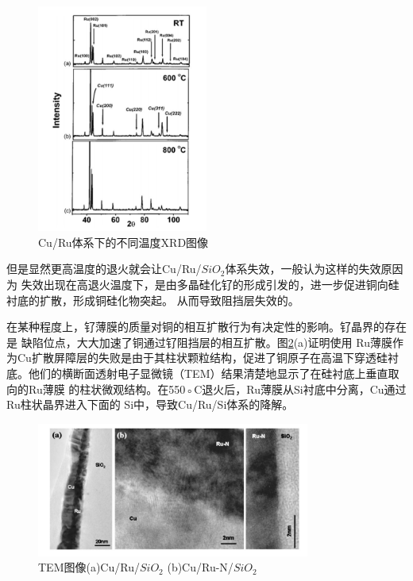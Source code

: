 \documentclass[UTF8,a4paper,12pt]{ctexart}%
\begin{document}
\begin{figure}[htb]
	\centering
	\includegraphics[width=0.5\textwidth]{3.jpg}
	\caption{Cu/Ru体系下的不同温度XRD图像}
	\label{Fig:3}
\end{figure}


但是显然更高温度的退火就会让Cu/Ru/$SiO_2$体系失效，一般认为这样的失效原因为
失效出现在高退火温度下，是由多晶硅化钌的形成引发的，进一步促进铜向硅衬底的扩散，形成铜硅化物突起。
从而导致阻挡层失效的。


在某种程度上，钌薄膜的质量对铜的相互扩散行为有决定性的影响。钌晶界的存在是
缺陷位点，大大加速了铜通过钌阻挡层的相互扩散。图\ref{Fig:4}(a)证明使用
Ru薄膜作为Cu扩散屏障层的失败是由于其柱状颗粒结构，促进了铜原子在高温下穿透硅衬
底。他们的横断面透射电子显微镜（TEM）结果清楚地显示了在硅衬底上垂直取向的Ru薄膜
的柱状微观结构。在550◦C退火后，Ru薄膜从Si衬底中分离，Cu通过Ru柱状晶界进入下面的
Si中，导致Cu/Ru/Si体系的降解。

\begin{figure}[htb]
	\centering
	\includegraphics[width=0.8\textwidth]{4.jpg}
	\caption{TEM图像(a)Cu/Ru/$SiO_2$ (b)Cu/Ru-N/$SiO_2$}
	\label{Fig:4}
\end{figure}
\end{document}
